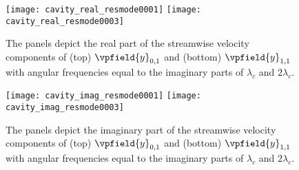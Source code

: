 \begin{figure}
	\centering
	\texttt{[image: cavity\_real\_resmode0001]}
	\texttt{[image: cavity\_real\_resmode0003]}
	\caption{The panels depict the real part of the streamwise velocity components of (top) $\vpfield{y}_{0,1}$ and (bottom) $\vpfield{y}_{1,1}$ with angular frequencies equal to the imaginary parts of $\lambda_{c}$ and $2\lambda_{c}$.}
	\label{fig:cavity_resolvents_oscillatory_real}
\end{figure}
\begin{figure}
	\centering
	\texttt{[image: cavity\_imag\_resmode0001]}
	\texttt{[image: cavity\_imag\_resmode0003]}
	\caption{The panels depict the imaginary part of the streamwise velocity components of (top) $\vpfield{y}_{0,1}$ and (bottom) $\vpfield{y}_{1,1}$ with angular frequencies equal to the imaginary parts of $\lambda_{c}$ and $2\lambda_{c}$.}
	\label{fig:cavity_resolvents_oscillatory_imag}
\end{figure}

